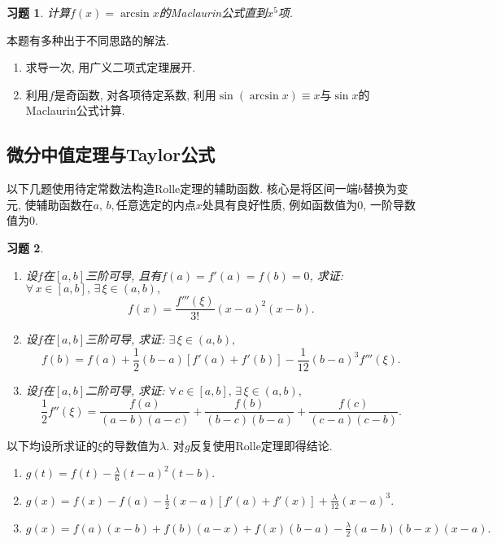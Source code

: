 \documentclass[11pt,a4paper]{ctexart}
\makeatletter
\theoremstyle{thmseries} %
\theoremstyle{exerseries}
\newtheorem{exer}{习题}[section]
\renewenvironment{proof}[1][\proofname]{\par
  \pushQED{\qed}%
  \normalfont \topsep6\p@\@plus6\p@\relax
  \trivlist
  \item[\hskip\labelsep
        \itshape
    #1\@addpunct{}]\ignorespaces
}{%
  \popQED\endtrivlist\@endpefalse
}
\newenvironment{sol}{\begin{proof}[\bfseries\upshape 解\quad]}{\end{proof}}
\newenvironment{pf}{\begin{proof}[\bfseries\upshape 证\quad]}{\end{proof}}
\newcommand{\sbra}[1]{\mathopen{}\left[#1\right]}
\makeatother
\begin{document}
\begin{exer}
	计算$f(x)=\arcsin x$的Maclaurin公式直到$x^5$项. 
\end{exer}
\begin{sol}
	本题有多种出于不同思路的解法. 
	\begin{enumerate}
		\item 求导一次, 用广义二项式定理展开. 
		\item 利用$f$是奇函数, 对各项待定系数, 利用$\sin(\arcsin x)\equiv x$与$\sin x$的Maclaurin公式计算. \qedhere
	\end{enumerate}
\end{sol}


\subsection{微分中值定理与Taylor公式}
以下几题使用待定常数法构造Rolle定理的辅助函数. 核心是将区间一端$b$替换为变元, 使辅助函数在$a,\,b,$任意选定的内点$x$处具有良好性质, 例如函数值为0, 一阶导数值为0. 
\begin{exer}
	\phantom{text}
	\begin{enumerate}
		\item 设$f$在$[a,b]$三阶可导, 且有$f(a)=f'(a)=f(b)=0$, 求证: $\forall\,x\in[a,b],\,\exists\,\xi\in(a,b),$
		\[f(x)=\frac{f'''(\xi)}{3!}(x-a)^2(x-b).\]
		\item 设$f$在$[a,b]$三阶可导, 求证: $\exists\,\xi\in(a,b),$
		\[f(b)=f(a)+\frac{1}{2}(b-a)[f'(a)+f'(b)]-\frac{1}{12}(b-a)^3f'''(\xi).\]
		\item 设$f$在$[a,b]$二阶可导, 求证: $\forall\,c\in[a,b],\,\exists\,\xi\in(a,b),$
		\[\frac{1}{2}f''(\xi)=\frac{f(a)}{(a-b)(a-c)}+\frac{f(b)}{(b-c)(b-a)}+\frac{f(c)}{(c-a)(c-b)}.\]
	\end{enumerate}
\end{exer}
\begin{pf}
	以下均设所求证的$\xi$的导数值为$\lambda$. 对$g$反复使用Rolle定理即得结论. 
	\begin{enumerate}
		\item $g(t)=f(t)-\frac{\lambda}{6}(t-a)^2(t-b).$
		\item $g(x)=f(x)-f(a)-\frac{1}{2}(x-a)\sbra{f'(a)+f'(x)}+\frac{\lambda}{12}(x-a)^3.$
		\item $g(x)=f(a)(x-b)+f(b)(a-x)+f(x)(b-a)-\frac{\lambda}{2}(a-b)(b-x)(x-a).$\qedhere
	\end{enumerate}
\end{pf}
\end{document}
